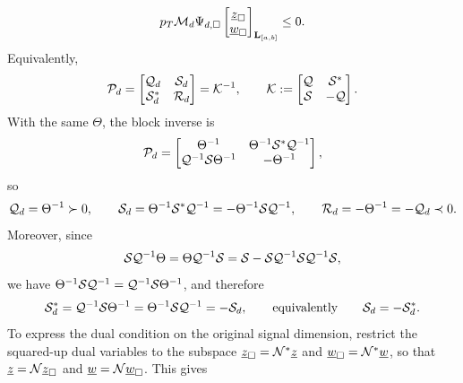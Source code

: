 \begin{example}
\begin{equation}
{        }{
            p_T\mathcal{M}_d\Psi_{d,\square}
            \begin{bmatrix}\underline{z}_{\square}\\\underline{w}_{\square}\end{bmatrix}
        }_{\mathbf{L}_{[a,b]}}
        \leq0.
    \end{equation}
    Equivalently,
    \begin{equation}
        \mathcal{P}_d
        =
        \begin{bmatrix}\mathcal{Q}_d & \mathcal{S}_d\\
              \mathcal{S}_d^* & \mathcal{R}_d\end{bmatrix}
        =
        \mathcal{K}^{-1},
        \qquad
        \mathcal{K}
        :=
        \begin{bmatrix}\mathcal{Q} & \mathcal{S}^*\\
              \mathcal{S} & -\mathcal{Q}\end{bmatrix} .
    \end{equation}
    With the same $\Theta$, the block inverse is
    \begin{equation}
        \mathcal{P}_d
        =
        \begin{bmatrix}
            \Theta^{-1}
            &
            \Theta^{-1}\mathcal{S}^*\mathcal{Q}^{-1}\\
            \mathcal{Q}^{-1}\mathcal{S}\Theta^{-1}
            &
            -\Theta^{-1}
        \end{bmatrix},
    \end{equation}
    so
    \begin{equation}
        \mathcal{Q}_d=\Theta^{-1}\succ0,
        \qquad
        \mathcal{S}_d
        =
        \Theta^{-1}\mathcal{S}^*\mathcal{Q}^{-1}
        =
        -\Theta^{-1}\mathcal{S}\mathcal{Q}^{-1},
        \qquad
        \mathcal{R}_d=-\Theta^{-1}=-\mathcal{Q}_d\prec0.
    \end{equation}
    Moreover, since
    \begin{equation}
        \mathcal{S}\mathcal{Q}^{-1}\Theta
        =
        \Theta\mathcal{Q}^{-1}\mathcal{S}
        =
        \mathcal{S}
        -
        \mathcal{S}\mathcal{Q}^{-1}\mathcal{S}\mathcal{Q}^{-1}\mathcal{S},
    \end{equation}
    we have $\Theta^{-1}\mathcal{S}\mathcal{Q}^{-1}
    =\mathcal{Q}^{-1}\mathcal{S}\Theta^{-1}$, and therefore
    \begin{equation}
        \mathcal{S}_d^*
        =
        \mathcal{Q}^{-1}\mathcal{S}\Theta^{-1}
        =
        \Theta^{-1}\mathcal{S}\mathcal{Q}^{-1}
        =
        -\mathcal{S}_d,
        \qquad\text{equivalently}\qquad
        \mathcal{S}_d=-\mathcal{S}_d^* .
    \end{equation}
    To express the dual condition on the original signal dimension, restrict
    the squared-up dual variables to the subspace
    $\underline{z}_\square=\mathcal{N}^*\underline{z}$ and
    $\underline{w}_\square=\mathcal{N}^*\underline{w}$, so that
    $\underline{z}=\mathcal{N}\underline{z}_\square$ and
    $\underline{w}=\mathcal{N}\underline{w}_\square$. This gives

\end{example}
